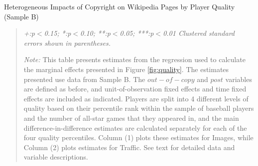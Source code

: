 

\newpage
\begin{center}
\begin{table}[!htbp]
\caption{Heterogeneous Impacts of Copyright on Wikipedia Pages by Player Quality (Sample B)}
\vspace{5mm}


\begin{quote}
\vspace{5mm}

\emph{+:p$<$0.15; *:p$<$0.10; **:p$<$0.05; ***:p$<$0.01 
\newline
Clustered standard errors shown in parentheses.}

\vspace{5mm}

\emph{Note:} This table presents estimates from the regression used to calculate the marginal effects presented in Figure \ref{fig:quality}. The estimates presented use data from Sample B.  The $out-of-copy$ and $post$ variables are defined as before, and unit-of-observation fixed effects and time fixed effects are included as indicated. Players are split into 4 different levels of quality based on their percentile rank within the sample of baseball players and the number of all-star games that they appeared in, and the main difference-in-difference estimates are calculated separately for each of the four quality percentiles. Column (1) plots these estimates for Images, while Column (2) plots estimates for Traffic. See text for detailed data and variable descriptions.
\end{quote}
\label{tab:reg_chart_qual}
\end{table}
\end{center}


